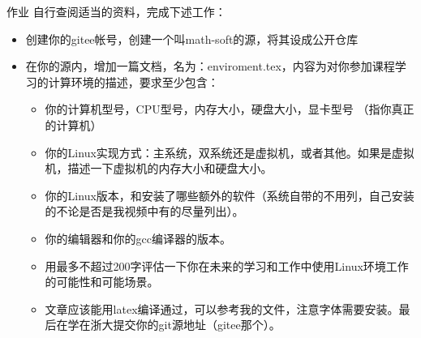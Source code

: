 \documentclass{beamer}
\begin{document}
\begin{frame}{作业}
  自行查阅适当的资料，完成下述工作：
  \begin{itemize}
  \item 创建你的gitee帐号，创建一个叫math-soft的源，将其设成公开仓库
  \item 在你的源内，增加一篇文档，名为：enviroment.tex，内容为对你参加课程学习的计算环境的描述，要求至少包含：
    \begin{itemize}
    \item 你的计算机型号，CPU型号，内存大小，硬盘大小，显卡型号 （指你真正的计算机）
    \item 你的Linux实现方式：主系统，双系统还是虚拟机，或者其他。如果是虚拟机，描述一下虚拟机的内存大小和硬盘大小。
    \item 你的Linux版本，和安装了哪些额外的软件（系统自带的不用列，自己安装的不论是否是我视频中有的尽量列出）。
    \item 你的编辑器和你的gcc编译器的版本。
    \item 用最多不超过200字评估一下你在未来的学习和工作中使用Linux环境工作的可能性和可能场景。
    \item 文章应该能用latex编译通过，可以参考我的文件，注意字体需要安装。最后在学在浙大提交你的git源地址（gitee那个）。
    \end{itemize}
  \end{itemize}
\end{frame}
\end{document}
